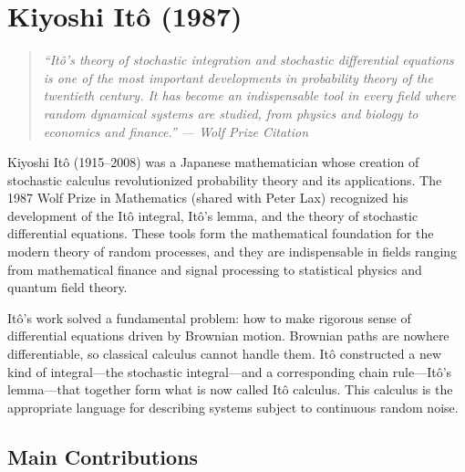 \let\im\relax
\newcommand{\im}{\operatorname{im}}
\let\N\relax
\newcommand{\N}{\mathbb{N}}
\let\R\relax
\newcommand{\R}{\mathbb{R}}
\let\C\relax
\newcommand{\C}{\mathbb{C}}
\let\Q\relax
\newcommand{\Q}{\mathbb{Q}}
\let\Z\relax
\newcommand{\Z}{\mathbb{Z}}
\let\E\relax
\newcommand{\E}{\mathbb{E}}
\let\Var\relax
\newcommand{\Var}{\operatorname{Var}}
\let\cov\relax
\newcommand{\cov}{\operatorname{cov}}

\chapter{Kiyoshi It\^{o} (1987)}

\begin{quote}
\it ``It\^{o}'s theory of stochastic integration and stochastic differential equations is one of the most important developments in probability theory of the twentieth century. It has become an indispensable tool in every field where random dynamical systems are studied, from physics and biology to economics and finance.'' --- Wolf Prize Citation
\end{quote}

Kiyoshi It\^{o} (1915--2008) was a Japanese mathematician whose creation of stochastic calculus revolutionized probability theory and its applications. The 1987 Wolf Prize in Mathematics (shared with Peter Lax) recognized his development of the It\^{o} integral, It\^{o}'s lemma, and the theory of stochastic differential equations. These tools form the mathematical foundation for the modern theory of random processes, and they are indispensable in fields ranging from mathematical finance and signal processing to statistical physics and quantum field theory.

It\^{o}'s work solved a fundamental problem: how to make rigorous sense of differential equations driven by Brownian motion. Brownian paths are nowhere differentiable, so classical calculus cannot handle them. It\^{o} constructed a new kind of integral---the stochastic integral---and a corresponding chain rule---It\^{o}'s lemma---that together form what is now called It\^{o} calculus. This calculus is the appropriate language for describing systems subject to continuous random noise.

\section{Main Contributions}

